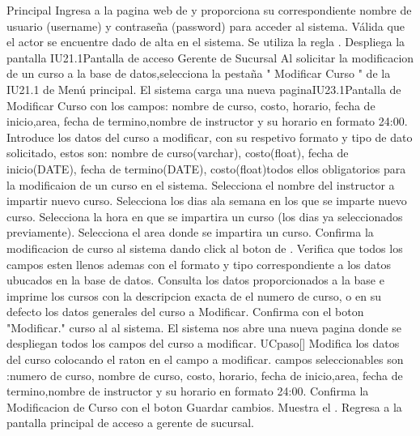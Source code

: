 	\newpage
	\begin{UCtrayectoria}{Principal}
	\UCpaso[\UCactor] Ingresa a la pagina web de \label{CU23.0Login} y proporciona su correspondiente nombre de usuario (username) y contraseña (password) para acceder al sistema.
		\UCpaso Válida que el actor se encuentre dado de alta en el sistema. Se utiliza la regla  .
	\UCpaso Despliega la pantalla {IU21.1}{Pantalla de acceso Gerente de Sucursal}
	\UCpaso[\UCactor] Al solicitar la modificacion de un curso a la base de datos,selecciona la pestaña " Modificar Curso  " de la IU21.1 de Menú principal.
	\UCpaso El sistema carga una nueva pagina{IU23.1}{Pantalla de Modificar Curso} con los campos: nombre de curso, costo, horario, fecha de inicio,area, fecha de termino,nombre de instructor y su  horario en formato 24:00.
	\UCpaso[\UCactor] Introduce los datos del curso a modificar, con su respetivo formato y tipo de dato solicitado, estos son: nombre de curso(varchar), costo(float), fecha de inicio(DATE), fecha de termino(DATE), costo(float)todos ellos obligatorios para la modificaion de un curso en el sistema.
    \UCpaso[\UCactor] Selecciona el nombre del instructor a impartir nuevo curso.
	\UCpaso[\UCactor] Selecciona los dias ala semana en los que se imparte nuevo curso.
	\UCpaso[\UCactor] Selecciona la hora en que se impartira un curso (los dias ya seleccionados previamente).
	\UCpaso[\UCactor] Selecciona el area donde se impartira un curso.
	\UCpaso[\UCactor] Confirma la modificacion de curso al sistema dando click al boton  de \label{IU23.1 Modificar Curso}.
	\UCpaso Verifica que todos los campos esten llenos ademas con el formato y tipo correspondiente a los datos ubucados en la base de datos.  
		\UCpaso Consulta los datos proporcionados a la base e imprime los cursos con la descripcion exacta de el numero de curso, o en su defecto los datos generales del curso a Modificar.
	\UCpaso[\UCactor] Confirma con el boton "Modificar." curso al al sistema.
	\UCpaso El sistema nos abre una nueva pagina donde se despliegan todos los campos del curso a modificar.
	UCpaso[\UCactor] Modifica los datos del curso colocando el raton en el campo a modificar. campos seleccionables son :numero de curso, nombre de curso, costo, horario, fecha de inicio,area, fecha de termino,nombre de instructor y su  horario en formato 24:00.
	\UCpaso[\UCactor] Confirma la Modificacion de Curso con el boton Guardar cambios.
		\UCpaso Muestra el .
		\UCpaso Regresa a la pantalla principal de acceso a gerente de sucursal.
\end{UCtrayectoria}

